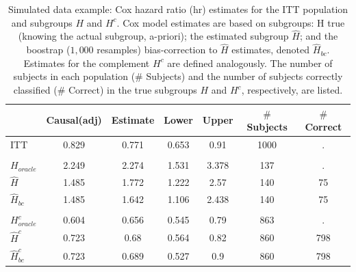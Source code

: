 \documentclass[smallextended]{svjour3}
\begin{document}
\begin{table}

\caption{\label{tab:simex_tab}\label{tab:simex} Simulated data example: Cox hazard ratio (hr) estimates for the ITT population and subgroups $H$ and $H^{c}$.
Cox model estimates are based on subgroups: H true (knowing the actual subgroup, a-priori); the estimated subgroup $\hat{H}$; and 
the boostrap ($1,000$ resamples) bias-correction to $\hat{H}$ estimates, denoted $\hat{H}_{bc}$.  Estimates for the complement $H^{c}$ are defined analogously.
The number of subjects in each population ($\#$ Subjects) and the number of subjects correctly classified ($\#$ Correct) in the true subgroups $H$ and $H^{c}$, respectively, are listed.}
\centering
\fontsize{9}{11}\selectfont
\begin{tabular}[t]{lcccccc}
\toprule
  & Causal(adj) & Estimate & Lower & Upper & $\#$ Subjects & $\#$ Correct\\
\midrule
ITT & 0.829 & 0.771 & 0.653 & 0.91 & 1000 & .\\
\addlinespace[0.3em]
\multicolumn{7}{l}{\textbf{H subgroup estimates}}\\
\hspace{1em}$H_{oracle}$ & 2.249 & 2.274 & 1.531 & 3.378 & 137 & .\\
\hspace{1em}$\hat{H}$ & 1.485 & 1.772 & 1.222 & 2.57 & 140 & 75\\
\hspace{1em}$\hat{H}_{bc}$ & 1.485 & 1.642 & 1.106 & 2.438 & 140 & 75\\
\addlinespace[0.3em]
\multicolumn{7}{l}{\textbf{H-complement subgroup estimates}}\\
\hspace{1em}$H^{c}_{oracle}$ & 0.604 & 0.656 & 0.545 & 0.79 & 863 & .\\
\hspace{1em}$\hat{H}^{c}$ & 0.723 & 0.68 & 0.564 & 0.82 & 860 & 798\\
\hspace{1em}$\hat{H}^{c}_{bc}$ & 0.723 & 0.689 & 0.527 & 0.9 & 860 & 798\\
\bottomrule
\end{tabular}
\end{table}





\end{document}
